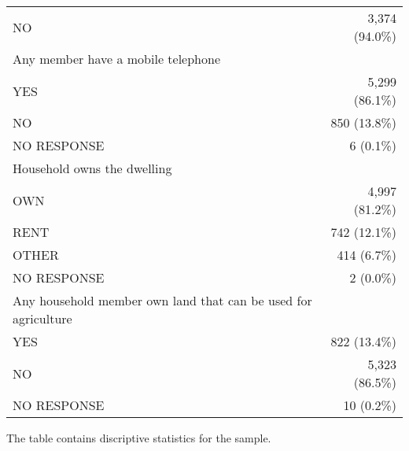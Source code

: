 \documentclass{article}
\begin{document}
\begin{table}[!h]
\begin{tabular}{ll}
\multicolumn{1}{l}{\hspace{1em}NO} &
  \multicolumn{1}{r}{3,374 (94.0\%)} \\
\multicolumn{1}{l}{Any member have a mobile telephone} &
  \multicolumn{1}{r}{} \\
\multicolumn{1}{l}{\hspace{1em}YES} &
  \multicolumn{1}{r}{5,299 (86.1\%)} \\
\multicolumn{1}{l}{\hspace{1em}NO} &
  \multicolumn{1}{r}{850 (13.8\%)} \\
\multicolumn{1}{l}{\hspace{1em}NO RESPONSE} &
  \multicolumn{1}{r}{6 (0.1\%)} \\
\multicolumn{1}{l}{Household owns the dwelling} &
  \multicolumn{1}{r}{} \\
\multicolumn{1}{l}{\hspace{1em}OWN} &
  \multicolumn{1}{r}{4,997 (81.2\%)} \\
\multicolumn{1}{l}{\hspace{1em}RENT} &
  \multicolumn{1}{r}{742 (12.1\%)} \\
\multicolumn{1}{l}{\hspace{1em}OTHER} &
  \multicolumn{1}{r}{414 (6.7\%)} \\
\multicolumn{1}{l}{\hspace{1em}NO RESPONSE} &
  \multicolumn{1}{r}{2 (0.0\%)} \\
\multicolumn{1}{l}{Any household member own land that can be used for agriculture} &
  \multicolumn{1}{r}{} \\
\multicolumn{1}{l}{\hspace{1em}YES} &
  \multicolumn{1}{r}{822 (13.4\%)} \\
\multicolumn{1}{l}{\hspace{1em}NO} &
  \multicolumn{1}{r}{5,323 (86.5\%)} \\
\multicolumn{1}{l}{\hspace{1em}NO RESPONSE} &
  \multicolumn{1}{r}{10 (0.2\%)} \\
\cline{1-2}
\end{tabular}

\footnotesize{
The table contains discriptive statistics for the sample.
}
\end{table}
\end{document}
